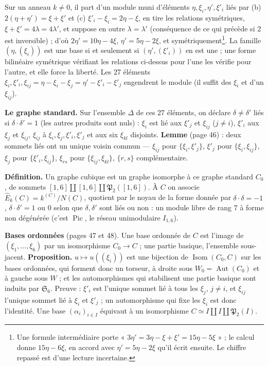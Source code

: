 \documentclass[11pt,a4paper]{article}
\begin{document}
Sur un anneau $k \neq 0$, il part d'un module muni d'éléments $\eta, \xi_i,
\eta', \xi'_i$ liés par (b) $2(\eta + \eta') = \xi + \xi'$ et (c) $\xi'_i -
\xi_i = 2\eta - \xi$, en tire les relations symétriques, $\xi + \xi' = 4\lambda
= 4\lambda'$, et suppose en outre $\lambda = \lambda'$ (conséquence de ce qui
précède si 2 est inversible) ; d'où $2\eta' = 10\eta - 4\xi$, $\eta' = 5\eta -
2\xi$, et symétriquement\footnote{Une formule intermédiaire porte « $3\eta' =
3\eta - \xi + \xi' = 15\eta - 5\xi$ » ; le calcul donne $15\eta - 6\xi$, en
accord avec $\eta' = 5\eta - 2\xi$ qu'il écrit ensuite. Le chiffre repassé est
d'une lecture incertaine.}. La famille $(\eta, (\xi_i))$ est une base si et
seulement si $(\eta', (\xi'_i))$ en est une ; une forme bilinéaire symétrique
vérifiant les relations ci-dessus pour l'une les vérifie pour l'autre, et
elle force la liberté. Les 27 éléments $\xi_i, \xi'_i, \xi_{ij} = \eta - \xi_i -
\xi_j = \eta' - \xi'_i - \xi'_j$ engendrent le module (il suffit des $\xi_i$ et
d'un $\xi_{ij}$).

\textbf{Le graphe standard.} Sur l'ensemble $\Delta$ de ces 27 éléments, on
déclare $\delta \neq \delta'$ liés si $\delta \cdot \delta' = 1$ (les autres
produits sont nuls) : $\xi_i$ est lié aux $\xi'_j$ et $\xi_{ij}$ ($j \neq i$),
$\xi'_i$ aux $\xi_j$ et $\xi_{ij}$, $\xi_{ij}$ à $\xi_i, \xi_j, \xi'_i,
\xi'_j$ et aux six $\xi_{kl}$ disjoints. \textbf{Lemme} (page 46) : deux
sommets liés ont un unique voisin commun --- $\xi_{ij}$ pour $\lbrace \xi_i,
\xi'_j\rbrace$, $\xi'_j$ pour $\lbrace \xi_i, \xi_{ij}\rbrace$, $\xi_j$ pour
$\lbrace\xi'_i, \xi_{ij}\rbrace$, $\xi_{rs}$ pour $\lbrace \xi_{ij},
\xi_{kl}\rbrace$, $\lbrace r, s\rbrace$ complémentaire.

\textbf{Définition.} Un graphe cubique est un graphe isomorphe à ce graphe
standard $C_0$, de sommets $[1,6] \amalg [1,6] \amalg \mathfrak{P}_2([1,6])$.
À $C$ on associe $\widehat E_k(C) = k^{(C)}/N(C)$, quotient par le noyau de la
forme donnée par $\delta \cdot \delta = -1$, $\delta \cdot \delta' = 1$ ou $0$
selon que $\delta, \delta'$ sont liés ou non : un module libre de rang 7 à
forme non dégénérée (c'est $\operatorname{Pic}$, le réseau unimodulaire
$I_{1,6}$).

\textbf{Bases ordonnées} (pages 47 et 48). Une base ordonnée de $C$ est
l'image de $(\xi_1, \ldots, \xi_6)$ par un isomorphisme $C_0 \to C$ ; une
partie basique, l'ensemble sous-jacent. \textbf{Proposition.} $u \mapsto
u((\xi_i))$ est une bijection de $\operatorname{Isom}(C_0, C)$ sur les bases
ordonnées, qui forment donc un torseur, à droite sous $W_0 =
\operatorname{Aut}(C_0)$ et à gauche sous $W$ ; et les automorphismes qui
stabilisent une partie basique sont induits par $\mathfrak{S}_6$. Preuve :
$\xi'_i$ est l'unique sommet lié à tous les $\xi_j$, $j \neq i$, et $\xi_{ij}$
l'unique sommet lié à $\xi_i$ et $\xi'_j$ ; un automorphisme qui fixe les
$\xi_i$ est donc l'identité. Une base $(\alpha_i)_{i \in I}$ équivaut à un
isomorphisme $C \simeq I \amalg I \amalg \mathfrak{P}_2(I)$.
\end{document}

